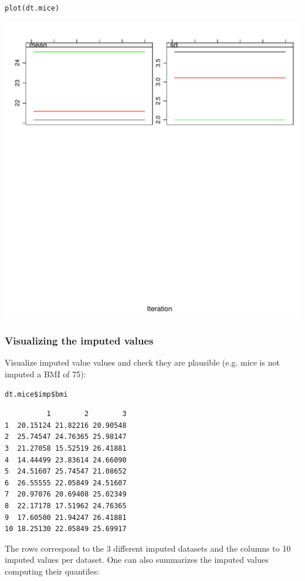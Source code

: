 \documentclass[12pt]{article}
\begin{document}
\lstset{language=r,label= ,caption= ,captionpos=b,numbers=none}
\begin{lstlisting}
plot(dt.mice)
\end{lstlisting}

\begin{center}
\includegraphics[width=.9\linewidth]{./traceCVimputed.pdf}
\end{center}

\subsubsection{Visualizing the imputed values}
\label{sec:org6fb57d8}
Visualize imputed value values and check they are plausible (e.g. mice
is not imputed a BMI of 75):
\lstset{language=r,label= ,caption= ,captionpos=b,numbers=none}
\begin{lstlisting}
dt.mice$imp$bmi
\end{lstlisting}

\begin{verbatim}
          1        2        3
1  20.15124 21.82216 20.90548
2  25.74547 24.76365 25.98147
3  21.27058 15.52519 26.41881
4  14.44499 23.83614 24.66090
5  24.51607 25.74547 21.08652
6  26.55555 22.05849 24.51607
7  20.97076 20.69408 25.02349
8  22.17178 17.51962 24.76365
9  17.60500 21.94247 26.41881
10 18.25130 22.05849 25.69917
\end{verbatim}

The rows correspond to the 3 different imputed datasets and the
columns to 10 imputed values per dataset. One can also summarizes the
imputed values computing their quantiles:
\end{document}
